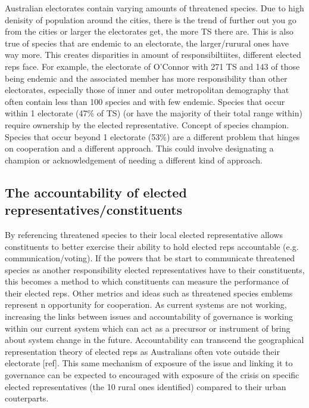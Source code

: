 \documentclass[a4paper,11pt]{article}
\begin{document}
Australian electorates contain varying amounts of threatened species. Due to high denisity of population around the cities, there is the trend of further out you go from the cities or larger the electorates get, the more TS there are. This is also true of species that are endemic to an electorate, the larger/rurural ones have way more. This creates disparities in amount of responsibiltiites, different elected reps face. For example, the electorate of O'Connor with 271 TS and 143 of those being endemic and the associated member has more responsibility than other electorates, especially those of inner and outer metropolitan demography that often contain less than 100 species and with few endemic.
Species that occur within 1 electorate (47\% of TS) (or have the majority of their total range within) require ownership by the elected representative. Concept of species champion.
Species that occur beyond 1 electorate (53\%) are a different problem that hinges on cooperation and a different approach. This could involve designating a champion or acknowledgement of needing a different kind of approach.

\subsection{The accountability of elected representatives/constituents}

By referencing threatened species to their local elected representative allows constituents to better exercise their ability to hold elected reps accountable (e.g. communication/voting). If the powers that be start to communicate threatened species as another responsibility elected representatives have to their constituents, this becomes a method to which constituents can measure the performance of their elected reps. Other metrics and ideas such as threatened species emblems represent n opportunity for cooperation.
As current systems are not working, increasing the links between issues and accountability of governance is working within our current system which can act as a precursor or instrument of bring about system change in the future.
Accountability can transcend the geographical representation theory of elected reps as Australians often vote outside their electorate [ref].
This same mechanism of exposure of the issue and linking it to governance can be expected to encouraged with exposure of the crisis on specific elected representatives (the 10 rural ones identified) compared to their urban couterparts.
\end{document}

